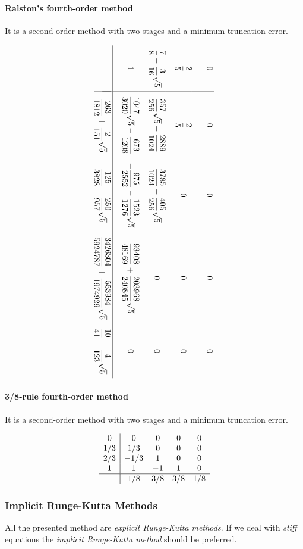 \paragraph{Ralston's fourth-order method}
It is a second-order method with two stages and a minimum truncation error.

\begin{equation}
  \rotatebox[origin=c]{-90}{$
  \begin{array}{c|ccccc}
    0          & 0          & 0           & 0          & 0 \\[1.5em]
    \dfrac{2}{5} & \dfrac{2}{5}  & 0           & 0          & 0 \\[1.5em]
    \dfrac{7}{8}-\dfrac{3}{16}\sqrt{5}
    & 
    \dfrac{357}{256}\sqrt{5}-\dfrac{2889}{1024} &
    \dfrac{3785}{1024}-\dfrac{405}{256}\sqrt{5}  & 0          & 0 \\[1.5em]
    1          & 
    \dfrac{1047}{3020}\sqrt{5}-\dfrac{673}{1208} &
    -\dfrac{975}{2552}-\dfrac{1523}{1276}\sqrt{5} &
    \dfrac{93408}{48169}+\dfrac{203968}{240845}\sqrt{5} & 0 \\[1.5em]
    \hline\\[-1em]
    & \dfrac{263}{1812}+\dfrac{2}{151}\sqrt{5} & 
    \dfrac{125}{3828}-\dfrac{250}{957}\sqrt{5} & 
    \dfrac{3426304}{5924787}+\dfrac{553984}{1974929}\sqrt{5} & 
    \dfrac{10}{41}-\dfrac{4}{123}\sqrt{5}
  \end{array}$}
  \label{eq::ralston4}
\end{equation}

\paragraph{3/8-rule fourth-order method}
It is a second-order method with two stages and a minimum truncation error.

\begin{equation}
	\begin{array}{c|cccc}
		 0  &  0   &  0  &  0  &  0  \\
		1/3 & 1/3  &  0  &  0  &  0  \\
		2/3 & -1/3 &  1  &  0  &  0  \\
		 1  &  1   & -1  &  1  &  0  \\ \hline
		    & 1/8  & 3/8 & 3/8 & 1/8
	\end{array}
\end{equation}

\subsubsection{Implicit Runge-Kutta Methods}
All the presented method are \textit{explicit Runge-Kutta methods}.
If we deal with \textit{stiff} equations the
\textit{implicit Runge-Kutta method} should be preferred.

